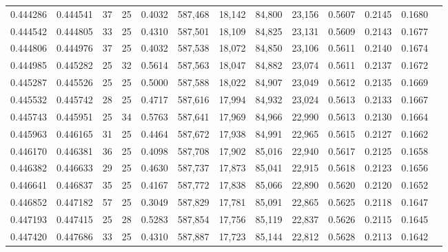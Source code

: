 \begin{tabular}{rrrrrrrrrrrrr}
0.444286 & 0.444541 &    37 &  25 &                                     0.4032 & 587,468 &  18,142 &  84,800 &  23,156 & 0.5607 & 0.2145 & 0.1680 \\
0.444542 & 0.444805 &    33 &  25 &                                     0.4310 & 587,501 &  18,109 &  84,825 &  23,131 & 0.5609 & 0.2143 & 0.1677 \\
0.444806 & 0.444976 &    37 &  25 &                                     0.4032 & 587,538 &  18,072 &  84,850 &  23,106 & 0.5611 & 0.2140 & 0.1674 \\
0.444985 & 0.445282 &    25 &  32 &                                     0.5614 & 587,563 &  18,047 &  84,882 &  23,074 & 0.5611 & 0.2137 & 0.1672 \\
0.445287 & 0.445526 &    25 &  25 &                                     0.5000 & 587,588 &  18,022 &  84,907 &  23,049 & 0.5612 & 0.2135 & 0.1669 \\
0.445532 & 0.445742 &    28 &  25 &                                     0.4717 & 587,616 &  17,994 &  84,932 &  23,024 & 0.5613 & 0.2133 & 0.1667 \\
0.445743 & 0.445951 &    25 &  34 &                                     0.5763 & 587,641 &  17,969 &  84,966 &  22,990 & 0.5613 & 0.2130 & 0.1664 \\
0.445963 & 0.446165 &    31 &  25 &                                     0.4464 & 587,672 &  17,938 &  84,991 &  22,965 & 0.5615 & 0.2127 & 0.1662 \\
0.446170 & 0.446381 &    36 &  25 &                                     0.4098 & 587,708 &  17,902 &  85,016 &  22,940 & 0.5617 & 0.2125 & 0.1658 \\
0.446382 & 0.446633 &    29 &  25 &                                     0.4630 & 587,737 &  17,873 &  85,041 &  22,915 & 0.5618 & 0.2123 & 0.1656 \\
0.446641 & 0.446837 &    35 &  25 &                                     0.4167 & 587,772 &  17,838 &  85,066 &  22,890 & 0.5620 & 0.2120 & 0.1652 \\
0.446852 & 0.447182 &    57 &  25 &                                     0.3049 & 587,829 &  17,781 &  85,091 &  22,865 & 0.5625 & 0.2118 & 0.1647 \\
0.447193 & 0.447415 &    25 &  28 &                                     0.5283 & 587,854 &  17,756 &  85,119 &  22,837 & 0.5626 & 0.2115 & 0.1645 \\
0.447420 & 0.447686 &    33 &  25 &                                     0.4310 & 587,887 &  17,723 &  85,144 &  22,812 & 0.5628 & 0.2113 & 0.1642 \\

\end{tabular}
